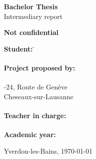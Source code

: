 
\begin{titlepage}
  \thispagestyle{firstpage}
  \begin{center}
    \vspace*{3cm}

    \Huge
    \textbf{Bachelor Thesis}\\

    \vspace{1cm}
    \TBtitle
    \vspace{1cm}
    Intermediary report

    \vspace{0.2cm}
    \Large
    \textbf{Not confidential}
  \end{center}

  \vspace{5.5cm}
  \begin{tabbing}
    \linespread{3}\textbf{Student:} \hspace{12em} \= \TBauthor\\\\

    \textbf{Project proposed by:} \> \TBindustryContact\\
    \> \TBindustryName\\
    -24, Route de Genève\\
     Cheseaux-sur-Lausanne\\\\

    \textbf{Teacher in charge:} \> \TBsupervisor\\\\

    \textbf{Academic year:} \> \TBacademicYears
  \end{tabbing}

  \vspace{2cm}
  \begin{flushright}
    Yverdon-les-Bains, \today
  \end{flushright}
\end{titlepage}
